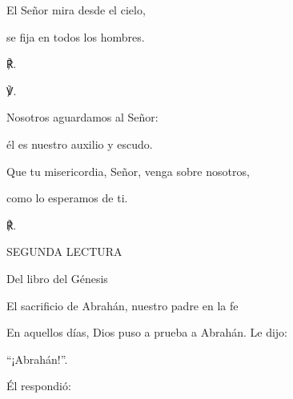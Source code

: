 			\begin{readtabbed}El Señor mira desde el cielo, \end{readtabbed}
			
			\begin{readtabbed}se fija en todos los hombres. \begin{readred}℟.\end{readred}\end{readtabbed}
			
			\begin{readbody}\begin{readred}℣.\end{readred} Nosotros aguardamos al Señor: \end{readbody}
			
			\begin{readtabbed}él es nuestro auxilio y escudo. \end{readtabbed}
			
			\begin{readtabbed}Que tu misericordia, Señor, venga sobre nosotros, \end{readtabbed}
			
			\begin{readtabbed}como lo esperamos de ti. \begin{readred}℟.\end{readred}\end{readtabbed}
			
			\begin{readtitle}SEGUNDA LECTURA\end{readtitle}
			
			\begin{readbook}Del libro del Génesis \end{readbook}
			
			\begin{readtheme}El sacrificio de Abrahán, nuestro padre en la fe\end{readtheme}
			
			\begin{readbody}En aquellos días, Dios puso a prueba a Abrahán. Le dijo: \end{readbody}
			
			\begin{readtalk}“¡Abrahán!”. \end{readtalk}
			
			\begin{readbody}Él respondió: \end{readbody}
			
